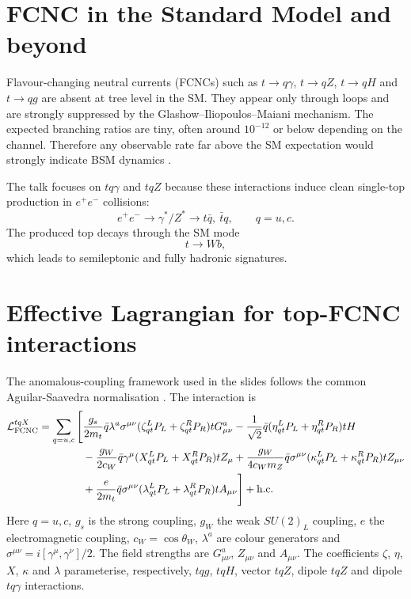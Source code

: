 \documentclass[11pt,a4paper]{report}
\newcommand{\ee}{e^+e^-}
\begin{document}
\section{FCNC in the Standard Model and beyond}
Flavour-changing neutral currents (FCNCs) such as $t\to q\gamma$, $t\to qZ$, $t\to qH$ and $t\to qg$ are absent at tree level in the SM.  They appear only through loops and are strongly suppressed by the Glashow--Iliopoulos--Maiani mechanism.  The expected branching ratios are tiny, often around $10^{-12}$ or below depending on the channel.  Therefore any observable rate far above the SM expectation would strongly indicate BSM dynamics \cite{AguilarSaavedra2004}.

The talk focuses on $tq\gamma$ and $tqZ$ because these interactions induce clean single-top production in $\ee$ collisions:
\begin{equation}
  \ee\to \gamma^*/Z^*\to t\bar q,\ \bar t q,
  \qquad q=u,c.
\end{equation}
The produced top decays through the SM mode
\begin{equation}
  t\to Wb,
\end{equation}
which leads to semileptonic and fully hadronic signatures.

\section{Effective Lagrangian for top-FCNC interactions}
The anomalous-coupling framework used in the slides follows the common Aguilar-Saavedra normalisation \cite{AguilarSaavedra2009}.  The interaction is
\begin{align}
\mathcal L_{\rm FCNC}^{tqX}=\sum_{q=u,c}\Bigg[&
\frac{g_s}{2m_t}\bar q\lambda^a\sigma^{\mu\nu}(\zeta^L_{qt}P_L+\zeta^R_{qt}P_R)tG^a_{\mu\nu}
-\frac{1}{\sqrt2}\bar q(\eta^L_{qt}P_L+\eta^R_{qt}P_R)tH \\
&-\frac{g_W}{2c_W}\bar q\gamma^\mu(X^L_{qt}P_L+X^R_{qt}P_R)tZ_\mu
+\frac{g_W}{4c_Wm_Z}\bar q\sigma^{\mu\nu}(\kappa^L_{qt}P_L+\kappa^R_{qt}P_R)tZ_{\mu\nu}\\
&+\frac{e}{2m_t}\bar q\sigma^{\mu\nu}(\lambda^L_{qt}P_L+\lambda^R_{qt}P_R)tA_{\mu\nu}
\Bigg]+{\rm h.c.}
\label{eq:fcncLag}
\end{align}
Here $q=u,c$, $g_s$ is the strong coupling, $g_W$ the weak $SU(2)_L$ coupling, $e$ the electromagnetic coupling, $c_W=\cos\theta_W$, $\lambda^a$ are colour generators and $\sigma^{\mu\nu}=i[\gamma^\mu,\gamma^\nu]/2$.  The field strengths are $G^a_{\mu\nu}$, $Z_{\mu\nu}$ and $A_{\mu\nu}$.  The coefficients $\zeta$, $\eta$, $X$, $\kappa$ and $\lambda$ parameterise, respectively, $tqg$, $tqH$, vector $tqZ$, dipole $tqZ$ and dipole $tq\gamma$ interactions.
\end{document}
